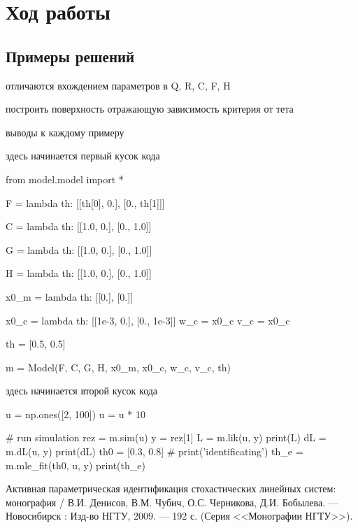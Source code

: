 \documentclass[a4paper,14pt]{extarticle}
\renewcommand{\baselinestretch}{1.5}
\begin{document}
\section{Ход работы}

\subsection{Примеры решений}

отличаются вхождением параметров в Q, R, C, F, H

построить поверхность отражающую зависимость критерия от тета

выводы к каждому примеру

здесь начинается первый кусок кода

\renewcommand{\baselinestretch}{1}
\begin{pyconsole}
from model.model import *

F = lambda th: [[th[0], 0.],
                [0., th[1]]]

C = lambda th: [[1.0, 0.],
                [0., 1.0]]

G = lambda th: [[1.0, 0.],
                [0., 1.0]]

H = lambda th: [[1.0, 0.],
                [0., 1.0]]

x0_m = lambda th: [[0.],
                   [0.]]

x0_c = lambda th: [[1e-3, 0.],
                   [0., 1e-3]]
w_c = x0_c
v_c = x0_c

th = [0.5, 0.5]

m = Model(F, C, G, H, x0_m, x0_c, w_c, v_c, th)
\end{pyconsole}
\renewcommand{\baselinestretch}{1.5}

\newpage

здесь начинается второй кусок кода
\begin{pyconsole}
u = np.ones([2, 100])
u = u * 10

# run simulation
rez = m.sim(u)
y = rez[1]
L = m.lik(u, y)
print(L)
dL = m.dL(u, y)
print(dL)
th0 = [0.3, 0.8]
# print('identificating')
th_e = m.mle_fit(th0, u, y) 
print(th_e)
\end{pyconsole}

\newpage

\begin{thebibliography}{9}

\begin{sloppypar}

 Активная параметрическая идентификация стохастических линейных
	систем: монография / В.И. Денисов, В.М. Чубич, О.С. Черникова, Д.И. Бобылева.
		--- Новосибирск : Изд-во НГТУ, 2009. --- 192 с.
		(Серия <<Монографии НГТУ>>).

\end{sloppypar}

\end{thebibliography}
\end{document}
